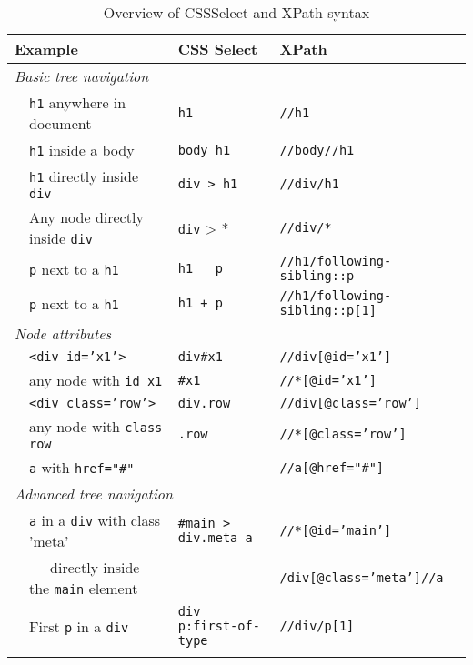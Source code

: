 \begin{table}
  \caption{\label{tab:cssselect}Overview of CSSSelect and XPath syntax}{
  \begin{tabularx}{\textwidth}{llll}
\toprule
\multicolumn{2}{l}{Example}      & CSS Select   & XPath    \\
\midrule
\multicolumn{3}{l}{\textit{Basic tree navigation}} \\
& \texttt{\small{h1}} anywhere in document & \texttt{\small{h1}} & \texttt{\small{//h1}} \\
& \texttt{\small{h1}} inside a body & \texttt{\small{body h1}} & \texttt{\small{//body//h1}} \\
& \texttt{\small{h1}} directly inside \texttt{\small{div}} & \texttt{\small{div > h1}} & \texttt{\small{//div/h1}} \\
& Any node directly inside \texttt{\small{div}} & \texttt{\small{div}} > * & \texttt{\small{//div/*}} \\
& \texttt{\small{p}} next to a \texttt{\small{h1}} & \texttt{\small{h1 ~ p}} & \texttt{\small{//h1/following-sibling::p}} \\
& \texttt{\small{p}} next to a \texttt{\small{h1}} & \texttt{\small{h1 + p}} & \texttt{\small{//h1/following-sibling::p[1]}} \\
\multicolumn{3}{l}{\textit{Node attributes}} \\
& \texttt{\small{<div id='x1'>}} & \texttt{\small{div\#x1}} & \texttt{\small{//div[@id='x1']}} \\
& any node with \texttt{\small{id x1}} & \texttt{\small{\#x1}} & \texttt{\small{//*[@id='x1']}} \\
& \texttt{\small{<div class='row'>}} & \texttt{\small{div.row}} & \texttt{\small{//div[@class='row']}} \\
& any node with \texttt{\small{class row}} & \texttt{\small{.row}} & \texttt{\small{//*[@class='row']}} \\
& \texttt{\small{a}} with \texttt{\small{href="\#"}} & \texttt{\small{a[href="#"]} & \texttt{\small{//a[@href="\#"]}} \\
\multicolumn{3}{l}{\textit{Advanced tree navigation}} \\
& \texttt{\small{a}} in a \texttt{\small{div}} with class 'meta' & \texttt{\small{\#main > div.meta a}} & \texttt{\small{//*[@id='main']}} \\
& $\;\;\;\;$ directly inside the \texttt{\small{main}} element & &$\;\;\;\;$ \texttt{\small{/div[@class='meta']//a}} \\
& First \texttt{\small{p}} in a \texttt{\small{div}} & \texttt{\small{div p:first-of-type}} & \texttt{\small{//div/p[1]}} \\
}
\end{tabularx}}
\end{table}
